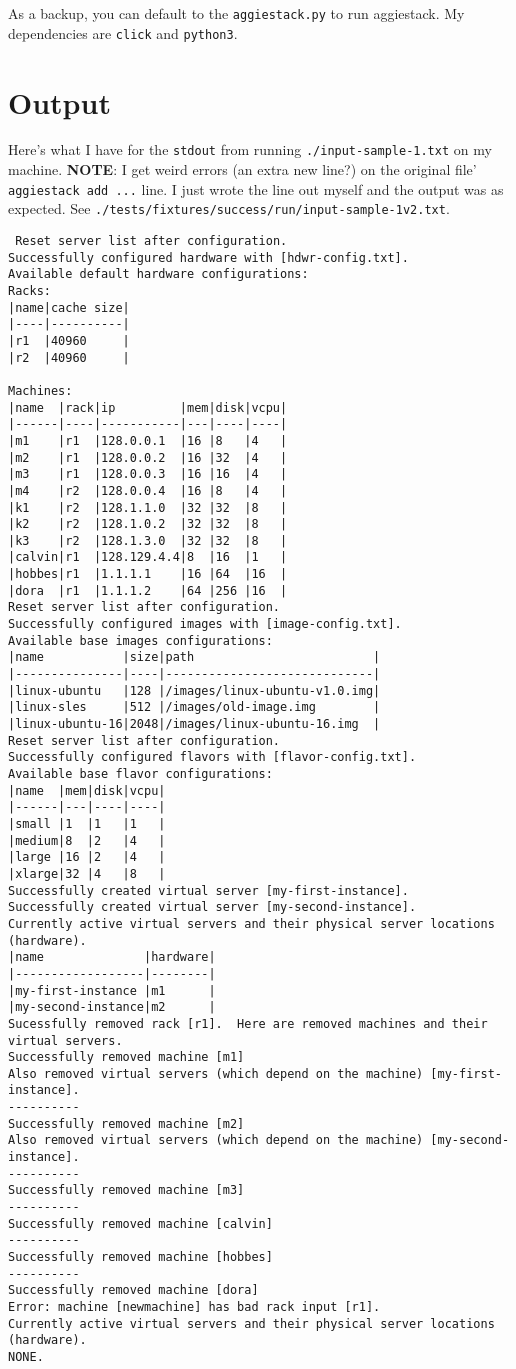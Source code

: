 \documentclass[11pt]{article}
\begin{document}
As a backup, you can default to the \texttt{aggiestack.py} to run aggiestack.  My dependencies are \texttt{click} and \texttt{python3}.

\section{Output}
\label{sec:org10c635a}
Here's what I have for the \texttt{stdout} from running \texttt{./input-sample-1.txt} on my machine.  \textbf{NOTE}:  I get weird errors (an extra new line?) on the original file' \texttt{aggiestack add ...} line.  I just wrote the line out myself and the output was as expected.  See \texttt{./tests/fixtures/success/run/input-sample-1v2.txt}.

\begin{verbatim}
 Reset server list after configuration.
Successfully configured hardware with [hdwr-config.txt].
Available default hardware configurations:
Racks:
|name|cache size|
|----|----------|
|r1  |40960     |
|r2  |40960     |

Machines:
|name  |rack|ip         |mem|disk|vcpu|
|------|----|-----------|---|----|----|
|m1    |r1  |128.0.0.1  |16 |8   |4   |
|m2    |r1  |128.0.0.2  |16 |32  |4   |
|m3    |r1  |128.0.0.3  |16 |16  |4   |
|m4    |r2  |128.0.0.4  |16 |8   |4   |
|k1    |r2  |128.1.1.0  |32 |32  |8   |
|k2    |r2  |128.1.0.2  |32 |32  |8   |
|k3    |r2  |128.1.3.0  |32 |32  |8   |
|calvin|r1  |128.129.4.4|8  |16  |1   |
|hobbes|r1  |1.1.1.1    |16 |64  |16  |
|dora  |r1  |1.1.1.2    |64 |256 |16  |
Reset server list after configuration.
Successfully configured images with [image-config.txt].
Available base images configurations:
|name           |size|path                         |
|---------------|----|-----------------------------|
|linux-ubuntu   |128 |/images/linux-ubuntu-v1.0.img|
|linux-sles     |512 |/images/old-image.img        |
|linux-ubuntu-16|2048|/images/linux-ubuntu-16.img  |
Reset server list after configuration.
Successfully configured flavors with [flavor-config.txt].
Available base flavor configurations:
|name  |mem|disk|vcpu|
|------|---|----|----|
|small |1  |1   |1   |
|medium|8  |2   |4   |
|large |16 |2   |4   |
|xlarge|32 |4   |8   |
Successfully created virtual server [my-first-instance].
Successfully created virtual server [my-second-instance].
Currently active virtual servers and their physical server locations (hardware).
|name              |hardware|
|------------------|--------|
|my-first-instance |m1      |
|my-second-instance|m2      |
Sucessfully removed rack [r1].  Here are removed machines and their virtual servers.
Successfully removed machine [m1]
Also removed virtual servers (which depend on the machine) [my-first-instance].
----------
Successfully removed machine [m2]
Also removed virtual servers (which depend on the machine) [my-second-instance].
----------
Successfully removed machine [m3]
----------
Successfully removed machine [calvin]
----------
Successfully removed machine [hobbes]
----------
Successfully removed machine [dora]
Error: machine [newmachine] has bad rack input [r1].
Currently active virtual servers and their physical server locations (hardware).
NONE. 
\end{verbatim}
\end{document}
